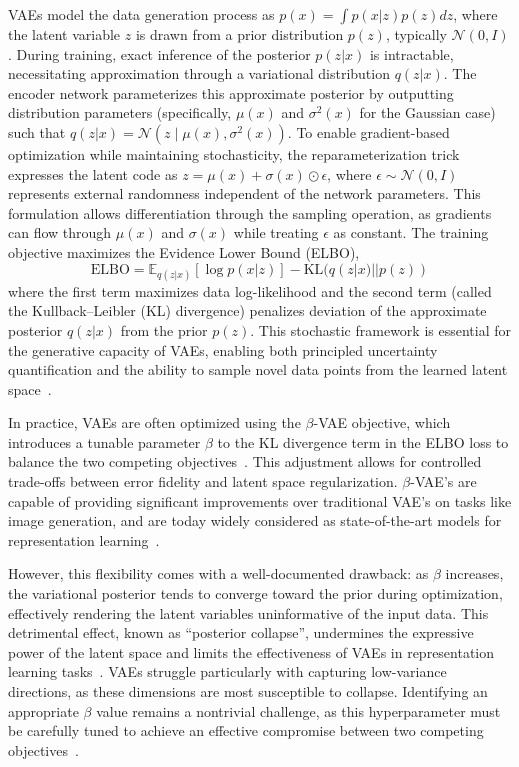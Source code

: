 \documentclass[twoside,11pt]{article}
\begin{document}
VAEs model the data generation process as $p(x) = \int p(x|z) p(z) dz$, where the latent variable $z$ is drawn from a prior distribution $p(z)$, typically $\mathcal{N}(0, I)$. During training, exact inference of the posterior $p(z|x)$ is intractable, necessitating approximation through a variational distribution $q(z|x)$. The encoder network parameterizes this approximate posterior by outputting distribution parameters (specifically, $\mu(x)$ and $\sigma^2(x)$ for the Gaussian case) such that $q(z|x) = \mathcal{N}(z \mid \mu(x), \sigma^2(x))$. To enable gradient-based optimization while maintaining stochasticity, the reparameterization trick expresses the latent code as $z = \mu(x) + \sigma(x) \odot \epsilon$, where $\epsilon \sim \mathcal{N}(0, I)$ represents external randomness independent of the network parameters. This formulation allows differentiation through the sampling operation, as gradients can flow through $\mu(x)$ and $\sigma(x)$ while treating $\epsilon$ as constant. The training objective maximizes the Evidence Lower Bound (ELBO),
\[\text{ELBO} = \mathbb{E}_{q(z|x)}[\log p(x|z)] - \text{KL}(q(z|x)||p(z))\]
where the first term maximizes data log-likelihood and the second term (called the Kullback–Leibler (KL) divergence) penalizes deviation of the approximate posterior $q(z|x)$ from the prior $p(z)$. This stochastic framework is essential for the generative capacity of VAEs, enabling both principled uncertainty quantification and the ability to sample novel data points from the learned latent space~\cite{kingma2014semi, Liu_VAE_UQ_2025}.

In practice, VAEs are often optimized using the $\beta$-VAE objective, which introduces a tunable parameter $\beta$ to the KL divergence term in the ELBO loss to balance the two competing objectives~\cite{Higgins2016betaVAELB, higgins2017beta}. This adjustment allows for controlled trade-offs between error fidelity and latent space regularization. $\beta$-VAE's  are capable of providing significant improvements over traditional VAE's on tasks like image generation, and are today widely considered as state-of-the-art models for representation learning~\cite{ higgins2017beta, locatello2019challenging}.

However, this flexibility comes with a well-documented drawback: as $\beta$ increases, the variational posterior tends to converge toward the prior during optimization, effectively rendering the latent variables uninformative of the input data. This detrimental effect, known as ``posterior collapse'', undermines the expressive power of the latent space and limits the effectiveness of VAEs in representation learning tasks~\cite{He2019LaggingIN}. VAEs struggle particularly with capturing low-variance directions, as these dimensions are most susceptible to collapse. Identifying an appropriate $\beta$ value remains a nontrivial challenge, as this hyperparameter must be carefully tuned to achieve an effective compromise between two competing objectives~\cite{fil2021beta}.
\end{document}

